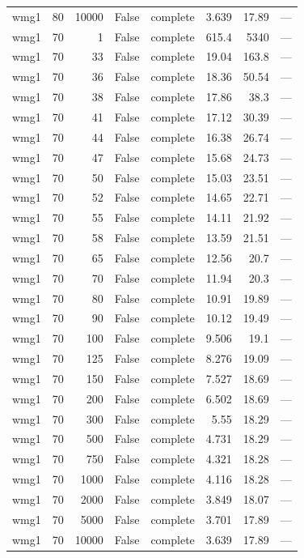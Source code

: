 \begin{tabular}{lrrrlrrl}
wmg1 & 80 & 10000 & False & complete & 3.639 & 17.89 & — \\
wmg1 & 70 & 1 & False & complete & 615.4 & 5340 & — \\
wmg1 & 70 & 33 & False & complete & 19.04 & 163.8 & — \\
wmg1 & 70 & 36 & False & complete & 18.36 & 50.54 & — \\
wmg1 & 70 & 38 & False & complete & 17.86 & 38.3 & — \\
wmg1 & 70 & 41 & False & complete & 17.12 & 30.39 & — \\
wmg1 & 70 & 44 & False & complete & 16.38 & 26.74 & — \\
wmg1 & 70 & 47 & False & complete & 15.68 & 24.73 & — \\
wmg1 & 70 & 50 & False & complete & 15.03 & 23.51 & — \\
wmg1 & 70 & 52 & False & complete & 14.65 & 22.71 & — \\
wmg1 & 70 & 55 & False & complete & 14.11 & 21.92 & — \\
wmg1 & 70 & 58 & False & complete & 13.59 & 21.51 & — \\
wmg1 & 70 & 65 & False & complete & 12.56 & 20.7 & — \\
wmg1 & 70 & 70 & False & complete & 11.94 & 20.3 & — \\
wmg1 & 70 & 80 & False & complete & 10.91 & 19.89 & — \\
wmg1 & 70 & 90 & False & complete & 10.12 & 19.49 & — \\
wmg1 & 70 & 100 & False & complete & 9.506 & 19.1 & — \\
wmg1 & 70 & 125 & False & complete & 8.276 & 19.09 & — \\
wmg1 & 70 & 150 & False & complete & 7.527 & 18.69 & — \\
wmg1 & 70 & 200 & False & complete & 6.502 & 18.69 & — \\
wmg1 & 70 & 300 & False & complete & 5.55 & 18.29 & — \\
wmg1 & 70 & 500 & False & complete & 4.731 & 18.29 & — \\
wmg1 & 70 & 750 & False & complete & 4.321 & 18.28 & — \\
wmg1 & 70 & 1000 & False & complete & 4.116 & 18.28 & — \\
wmg1 & 70 & 2000 & False & complete & 3.849 & 18.07 & — \\
wmg1 & 70 & 5000 & False & complete & 3.701 & 17.89 & — \\
wmg1 & 70 & 10000 & False & complete & 3.639 & 17.89 & — \\

\end{tabular}
